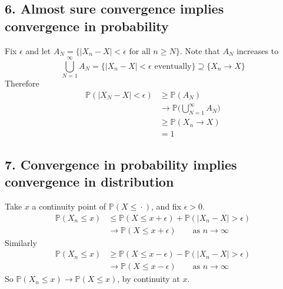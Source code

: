 \documentclass{article}
\begin{document}
\subsection*{6. Almost sure convergence implies convergence in probability}
Fix $\epsilon$ and let
$A_N = \{|X_n - X| < \epsilon \text{ for all } n \geq N\}$.
Note that $A_N$ increases to
$$\bigcup_{N=1}^\infty A_N = \{|X_n - X| < \epsilon \text{ eventually}\}
\supseteq \{X_n \to X\}$$
%
Therefore
\begin{align*}
  \mathbb{P}(|X_N - X| < \epsilon)
  &\geq \mathbb{P}(A_N) \\
  &\to \mathbb{P}\Big(\bigcup_{N=1}^\infty A_N\Big) \\
  &\geq \mathbb{P}(X_n \to X) \\
  &= 1
\end{align*}

\subsection*{7. Convergence in probability implies convergence in distribution}
Take $x$ a continuity point of $\mathbb{P}(X \leq \,\boldsymbol{\cdot}\,)$, and
fix $\epsilon > 0$.
\begin{align*}
  \mathbb{P}(X_n \leq x)
  &\leq \mathbb{P}(X \leq x+\epsilon) + \mathbb{P}(|X_n - X| > \epsilon) \\
  &\to \mathbb{P}(X \leq x+\epsilon) \qquad \text{as } n \to \infty
\end{align*}
%
Similarly
\begin{align*}
  \mathbb{P}(X_n \leq x)
  &\geq \mathbb{P}(X \leq x-\epsilon) - \mathbb{P}(|X_n - X| > \epsilon) \\
  &\to \mathbb{P}(X \leq x-\epsilon) \qquad \text{as } n \to \infty
\end{align*}
%
So $\mathbb{P}(X_n \leq x) \to \mathbb{P}(X \leq x)$, by continuity at $x$.
\end{document}
